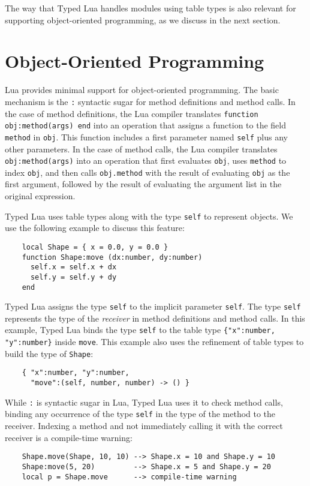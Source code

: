 The way that Typed Lua handles modules using table types is also
relevant for supporting object-oriented programming, as we discuss in
the next section.

\section{Object-Oriented Programming}
\label{sec:oop}

Lua provides minimal support for object-oriented programming.
The basic mechanism is the \texttt{:} syntactic sugar for method
definitions and method calls.
In the case of method definitions, the Lua compiler translates
\texttt{function obj:method(args) end} into an operation that
assigns a function to the field \texttt{method} in \texttt{obj}.
This function includes a first parameter named \texttt{self} plus
any other parameters.
In the case of method calls, the Lua compiler translates
\texttt{obj:method(args)} into an operation that first evaluates
\texttt{obj}, uses \texttt{method} to index \texttt{obj},
and then calls \texttt{obj.method} with the result of evaluating
\texttt{obj} as the first argument, followed by the result of
evaluating the argument list in the original expression.

Typed Lua uses table types along with the type \texttt{self} to
represent objects.
We use the following example to discuss this feature:
\begin{verbatim}
    local Shape = { x = 0.0, y = 0.0 }
    function Shape:move (dx:number, dy:number)
      self.x = self.x + dx
      self.y = self.y + dy
    end
\end{verbatim}

Typed Lua assigns the type \texttt{self} to the implicit parameter \texttt{self}.
The type \texttt{self} represents the type of the \emph{receiver}
in method definitions and method calls.
In this example, Typed Lua binds the type \texttt{self} to
the table type \texttt{\{"x":number, "y":number\}} inside \texttt{move}.
This example also uses the refinement of table types to build the
type of \texttt{Shape}:
\begin{verbatim}
    { "x":number, "y":number,
      "move":(self, number, number) -> () }
\end{verbatim}

While \texttt{:} is syntactic sugar in Lua, Typed Lua uses it
to check method calls, binding any occurrence of the type \texttt{self}
in the type of the method to the receiver.
Indexing a method and not immediately calling it with the correct
receiver is a compile-time warning:
\begin{verbatim}
    Shape.move(Shape, 10, 10) --> Shape.x = 10 and Shape.y = 10
    Shape:move(5, 20)         --> Shape.x = 5 and Shape.y = 20
    local p = Shape.move      --> compile-time warning
\end{verbatim}

